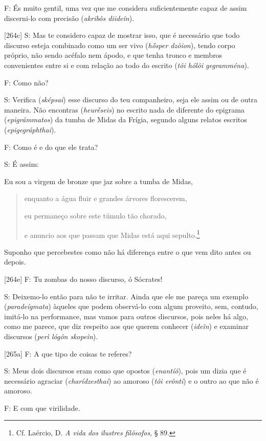 F: És muito gentil, uma vez que me considera suficientemente capaz de
assim discerni-lo com precisão (\emph{akribôs diideîn}).

{[}264c{]} S: Mas te considero capaz de mostrar isso, que é necessário
que todo discurso esteja combinado como um ser vivo (\emph{hṓsper
dzôion}), tendo corpo próprio, não sendo acéfalo nem ápodo, e que tenha
tronco e membros convenientes entre si e com relação ao todo do escrito
(\emph{tôi hólôi gegramména}).

F: Como não?

S: Verifica (\emph{sképsai}) esse discurso do teu companheiro, seja ele
assim ou de outra maneira. Não encontras (\emph{heurḗseis}) no escrito
nada de diferente do epigrama (\emph{epigrámmatos}) da tumba de Midas da
Frígia, segundo alguns relatos escritos (\emph{epigegráphthai}).

F: Como é e do que ele trata?

S: É assim:

Eu sou a virgem de bronze que jaz sobre a tumba de Midas,

\begin{quote}
enquanto a água fluir e grandes árvores florescerem,

eu permaneço sobre este túmulo tão chorado,

e anuncio aos que passam que Midas está aqui sepulto.\footnote{Cf.
  Laércio, D. \emph{A} \emph{vida} \emph{dos} \emph{ilustres}
  \emph{filósofos}, § 89.}
\end{quote}

Suponho que percebestes como não há diferença entre o que vem dito antes
ou depois.

{[}264e{]} F: Tu zombas do nosso discurso, ó Sócrates!

S: Deixemo-lo então para não te irritar. Ainda que ele me pareça um
exemplo (\emph{paradeígmata}) àqueles que podem observá-lo com algum
proveito, sem, contudo, imitá-lo na performance, mas vamos para outros
discursos, pois neles há algo, como me parece, que diz respeito aos que
querem conhecer (\emph{ideîn}) e examinar discursos (\emph{perì lógôn
skopeîn}).

{[}265a{]} F: A que tipo de coisas te referes?

S: Meus dois discursos eram como que opostos (\emph{enantíô}), pois um
dizia que é necessário agraciar (\emph{charídzesthai}) ao amoroso
(\emph{tôi erônti}) e o outro ao que não é amoroso.

F: E com que virilidade.

